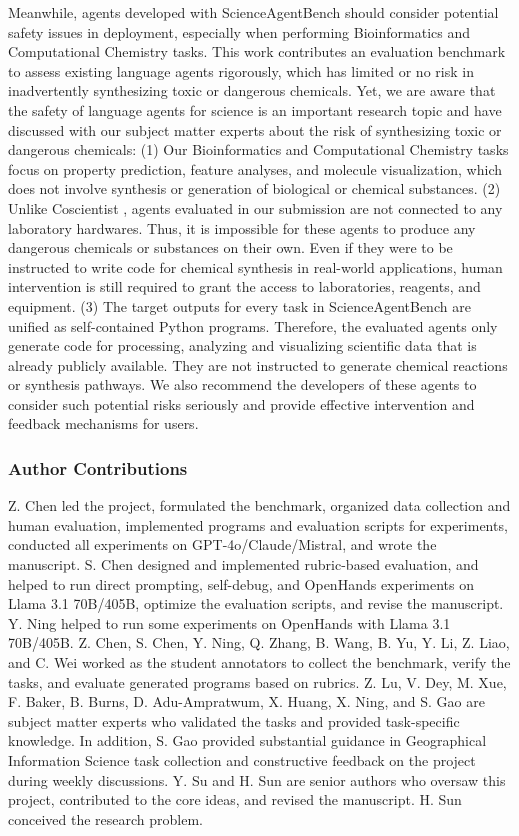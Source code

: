 \documentclass{article} %
\newcommand{\bench}{ScienceAgentBench\xspace}
\begin{document}
Meanwhile, agents developed with \bench should consider potential safety issues in deployment, especially when performing Bioinformatics and Computational Chemistry tasks.
This work contributes an evaluation benchmark to assess existing language agents rigorously, which has limited or no risk in inadvertently synthesizing toxic or dangerous chemicals. 
Yet, we are aware that the safety of language agents for science is an important research topic \citep{tang2024prioritizingsafeguardingautonomyrisks} and have discussed with our subject matter experts about the risk of synthesizing toxic or dangerous chemicals:
(1) Our Bioinformatics and Computational Chemistry tasks focus on property prediction, feature analyses, and molecule visualization, which does not involve synthesis or generation of biological or chemical substances.
(2) Unlike Coscientist \citep{coscientist}, agents evaluated in our submission are not connected to any laboratory hardwares. Thus, it is impossible for these agents to produce any dangerous chemicals or substances on their own. Even if they were to be instructed to write code for chemical synthesis in real-world applications, human intervention is still required to grant the access to laboratories, reagents, and equipment.
(3) The target outputs for every task in ScienceAgentBench are unified as self-contained Python programs. Therefore, the evaluated agents only generate code for processing, analyzing and visualizing scientific data that is already publicly available. They are not instructed to generate chemical reactions or synthesis pathways.
We also recommend the developers of these agents to consider such potential risks seriously and provide effective intervention and feedback mechanisms for users.

\subsubsection*{Author Contributions}
Z. Chen led the project, formulated the benchmark, organized data collection and human evaluation, implemented programs and evaluation scripts for experiments, conducted all experiments on GPT-4o/Claude/Mistral, and wrote the manuscript.
S. Chen designed and implemented rubric-based evaluation, and helped to run direct prompting, self-debug, and OpenHands experiments on Llama 3.1 70B/405B, optimize the evaluation scripts, and revise the manuscript.
Y. Ning helped to run some experiments on OpenHands with Llama 3.1 70B/405B.
Z. Chen, S. Chen, Y. Ning, Q. Zhang, B. Wang, B. Yu, Y. Li, Z. Liao, and C. Wei worked as the student annotators to collect the benchmark, verify the tasks, and evaluate generated programs based on rubrics.
Z. Lu, V. Dey, M. Xue, F. Baker, B. Burns, D. Adu-Ampratwum, X. Huang, X. Ning, and S. Gao are subject matter experts who validated the tasks and provided task-specific knowledge. 
In addition, S. Gao provided substantial guidance in Geographical Information Science task collection and constructive feedback on the project during weekly discussions.
Y. Su and H. Sun are senior authors who oversaw this project, contributed to the core ideas, and revised the manuscript. 
H. Sun conceived the research problem. 
\end{document}
